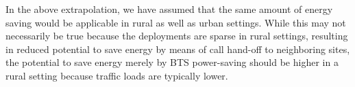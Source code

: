 In the above extrapolation, we have assumed that the same amount of energy saving would be applicable in rural as well as urban settings. While this may not necessarily be true because the deployments are sparse in rural settings, resulting in reduced potential to save energy by means of call hand-off to neighboring sites, the potential to save energy merely by BTS power-saving should be higher in a rural setting because traffic loads are typically lower.

